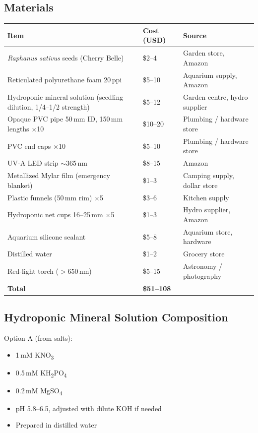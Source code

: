 \documentclass[10pt, a4paper]{article}
\begin{document}
\subsection{Materials}

\begin{tabular}{p{4.5cm}p{2.2cm}p{4.5cm}}
\toprule
\textbf{Item} & \textbf{Cost (USD)} & \textbf{Source} \\
\midrule
\textit{Raphanus sativus} seeds
(Cherry Belle) &
\$2--4 & Garden store, Amazon \\
Reticulated polyurethane foam 20\,ppi &
\$5--10 & Aquarium supply, Amazon \\
Hydroponic mineral solution
(seedling dilution, 1/4--1/2 strength) &
\$5--12 & Garden centre, hydro supplier \\
Opaque PVC pipe 50\,mm ID, 150\,mm lengths $\times$10 &
\$10--20 & Plumbing / hardware store \\
PVC end caps $\times$10 &
\$5--10 & Plumbing / hardware store \\
UV-A LED strip $\sim$365\,nm &
\$8--15 & Amazon \\
Metallized Mylar film (emergency blanket) &
\$1--3 & Camping supply, dollar store \\
Plastic funnels (50\,mm rim) $\times$5 &
\$3--6 & Kitchen supply \\
Hydroponic net cups 16--25\,mm $\times$5 &
\$1--3 & Hydro supplier, Amazon \\
Aquarium silicone sealant &
\$5--8 & Aquarium store, hardware \\
Distilled water &
\$1--2 & Grocery store \\
Red-light torch ($>$650\,nm) &
\$5--15 & Astronomy / photography \\
\midrule
\textbf{Total} & \textbf{\$51--108} & \\
\bottomrule
\end{tabular}

\subsection{Hydroponic Mineral Solution Composition}

Option A (from salts):
\begin{itemize}[itemsep=0.1em]
  \item 1\,mM KNO\textsubscript{3}
  \item 0.5\,mM KH\textsubscript{2}PO\textsubscript{4}
  \item 0.2\,mM MgSO\textsubscript{4}
  \item pH 5.8--6.5, adjusted with dilute KOH if needed
  \item Prepared in distilled water
\end{itemize}
\end{document}
